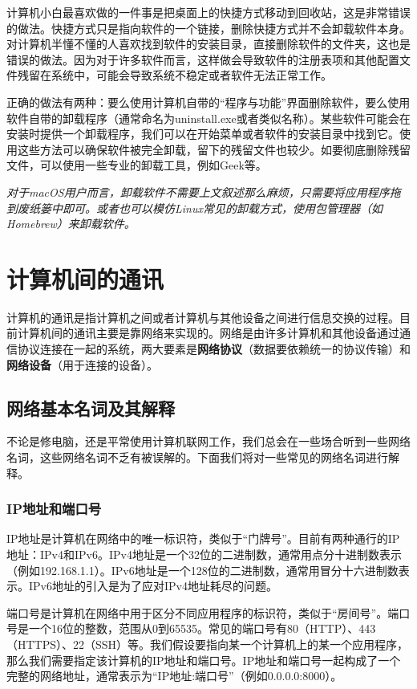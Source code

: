 \documentclass[../main.tex]{subfiles}
\begin{document}
计算机小白最喜欢做的一件事是把桌面上的快捷方式移动到回收站，这是非常错误的做法。快捷方式只是指向软件的一个链接，删除快捷方式并不会卸载软件本身。对计算机半懂不懂的人喜欢找到软件的安装目录，直接删除软件的文件夹，这也是错误的做法。因为对于许多软件而言，这样做会导致软件的注册表项和其他配置文件残留在系统中，可能会导致系统不稳定或者软件无法正常工作。

正确的做法有两种：要么使用计算机自带的“程序与功能”界面删除软件，要么使用软件自带的卸载程序（通常命名为uninstall.exe或者类似名称）。某些软件可能会在安装时提供一个卸载程序，我们可以在开始菜单或者软件的安装目录中找到它。使用这些方法可以确保软件被完全卸载，留下的残留文件也较少。如要彻底删除残留文件，可以使用一些专业的卸载工具，例如Geek等。

\emph{对于macOS用户而言，卸载软件不需要上文叙述那么麻烦，只需要将应用程序拖到废纸篓中即可。或者也可以模仿Linux常见的卸载方式，使用包管理器（如Homebrew）来卸载软件。}

\section{计算机间的通讯}

计算机的通讯是指计算机之间或者计算机与其他设备之间进行信息交换的过程。目前计算机间的通讯主要是靠网络来实现的。网络是由许多计算机和其他设备通过通信协议连接在一起的系统，两大要素是\textbf{网络协议}（数据要依赖统一的协议传输）和\textbf{网络设备}（用于连接的设备）。

\subsection{网络基本名词及其解释}

不论是修电脑，还是平常使用计算机联网工作，我们总会在一些场合听到一些网络名词，这些网络名词不乏有被误解的。下面我们将对一些常见的网络名词进行解释。

\subsubsection{IP地址和端口号}
IP地址是计算机在网络中的唯一标识符，类似于“门牌号”。目前有两种通行的IP地址：IPv4和IPv6。IPv4地址是一个32位的二进制数，通常用点分十进制数表示（例如192.168.1.1）。IPv6地址是一个128位的二进制数，通常用冒分十六进制数表示。IPv6地址的引入是为了应对IPv4地址耗尽的问题。

端口号是计算机在网络中用于区分不同应用程序的标识符，类似于“房间号”。端口号是一个16位的整数，范围从0到65535。常见的端口号有80（HTTP）、443（HTTPS）、22（SSH）等。我们假设要指向某一个计算机上的某一个应用程序，那么我们需要指定该计算机的IP地址和端口号。IP地址和端口号一起构成了一个完整的网络地址，通常表示为“IP地址:端口号”（例如0.0.0.0:8000）。
\end{document}
